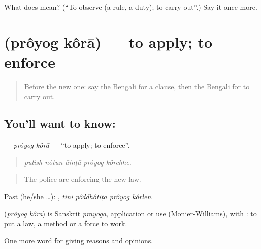 \begin{tcolorbox}[breakable,colback=teal!4,colframe=teal!35!black,title={Before you move on}]
What does   mean? (\textquotedblleft{}To observe (a rule, a duty); to carry out\textquotedblright{}.) Say it once more.
\end{tcolorbox}
\section[\texorpdfstring{\bn{প্রয়োগ} \bn{করা} (prôyog kôrā)}{প্রয়োগ করা (prôyog kôrā)}]{  (prôyog kôrā) — to apply; to enforce}

\label{lesson:BN-C340-proyog-kora}



\begin{quote}
Before the new one: say the Bengali for a clause, then the Bengali for to carry out.
\end{quote}

\subsection*{You'll want to know:  }
\textbf{ } — \emph{prôyog kôrā} — \textquotedblleft{}to apply; to enforce\textquotedblright{}.

\begin{quote}
    
\end{quote}

\begin{quote}
\emph{pulish nôtun āinṭā prôyog kôrchhe.}
\end{quote}

\begin{quote}
The police are enforcing the new law.
\end{quote}

Past (he/she …):    , \emph{tini pôddhôtiṭā prôyog kôrlen}.

\begin{cousinweb}
\textbf{ } (\emph{prôyog kôrā}) is Sanskrit \emph{prayoga}, application or use (Monier-Williams), with : to put a law, a method or a force to work.
\end{cousinweb}

\begin{grammarlens}[title={What you've built}]
One more word for giving reasons and opinions.
\end{grammarlens}

